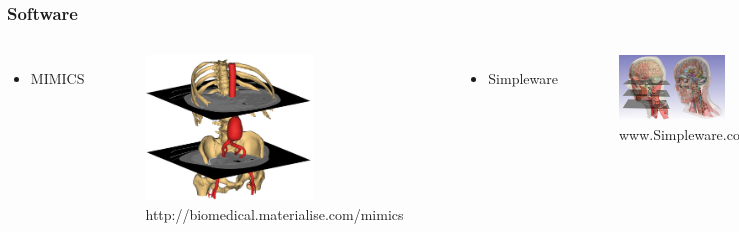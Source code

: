 \documentclass[9pt]{beamer}
\begin{document}
\begin{frame}
	\frametitle{Software}

	\begin{columns}
			\begin{itemize}
	\item MIMICS
	\end{itemize}
	\begin{figure}
	\includegraphics[width=0.65\textwidth]{mimics}
	\caption{http://biomedical.materialise.com/mimics}
	\end{figure}
				\begin{itemize}
	\item Simpleware
	\end{itemize}
	\begin{figure}
	\includegraphics[width=0.8\textwidth]{head_intro}
	\caption{www.Simpleware.com}
	\end{figure}
	\end{columns}
\end{frame}
\end{document}
